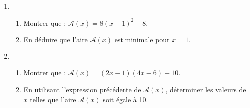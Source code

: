\begin{multicols}{2}
\begin{prob}
\begin{enumerate}
 \item \begin{enumerate}
        \item Montrer que : $\mathcal{A}(x)=8(x-1)^2+8$.
        \item En d\'eduire que l'aire $\mathcal{A}(x)$ est minimale pour $x=1$.
       \end{enumerate}
 \item \begin{enumerate}
        \item Montrer que : $\mathcal{A}(x)=(2x-1)(4x-6)+10$.
	\item En utilisant l'expression pr\'ec\'edente de $\mathcal{A}(x)$, d\'eterminer les valeurs de $x$ telles que l'aire $\mathcal{A}(x)$ soit \'egale \`a 10.
       \end{enumerate}


\end{enumerate}

\end{prob}\end{multicols}\vspace{-1em}


